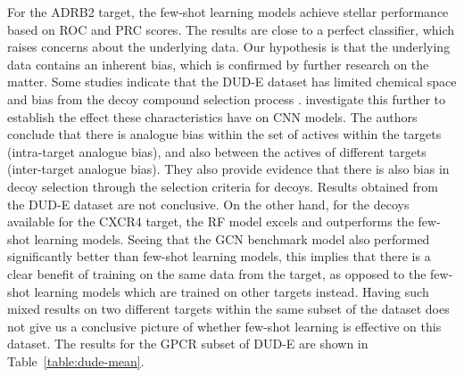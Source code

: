 For the ADRB2 target, the few-shot learning models achieve stellar performance based on ROC and PRC scores. The results are close to a perfect classifier, which raises concerns about the underlying data. Our hypothesis is that the underlying data contains an inherent bias, which is confirmed by further research on the matter. Some studies indicate that the DUD-E dataset has limited chemical space and bias from the decoy compound selection process \cite{smusz2013influence, wallach2018most}. \citet{chen2019hidden} investigate this further to establish the effect these characteristics have on CNN models. The authors conclude that there is analogue bias within the set of actives within the targets (intra-target analogue bias), and also between the actives of different targets (inter-target analogue bias). They also provide evidence that there is also bias in decoy selection through the selection criteria for decoys. Results obtained from the DUD-E dataset are not conclusive. On the other hand, for the decoys available for the CXCR4 target, the RF model excels and outperforms the few-shot learning models. Seeing that the GCN benchmark model also performed significantly better than few-shot learning models, this implies that there is a clear benefit of training on the same data from the target, as opposed to the few-shot learning models which are trained on other targets instead. Having such mixed results on two different targets within the same subset of the dataset does not give us a conclusive picture of whether few-shot learning is effective on this dataset. The results for the GPCR subset of DUD-E are shown in Table~\ref{table:dude-mean}.


